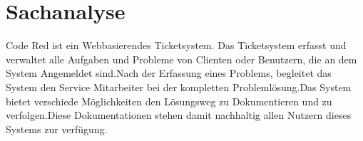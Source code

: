 \chapter{Sachanalyse}  %
\label{chapter:Sachanalyse}  %

Code Red ist ein Webbasierendes Ticketsystem. Das Ticketsystem erfasst und verwaltet alle Aufgaben und Probleme von Clienten oder Benutzern, die an dem System Angemeldet sind.Nach der Erfassung eines Problems, begleitet das System den Service Mitarbeiter bei der kompletten Problemlösung.Das System bietet verschiede Möglichkeiten den Lösungsweg zu Dokumentieren und zu verfolgen.Diese Dokumentationen stehen damit nachhaltig allen Nutzern dieses Systems zur verfügung.

